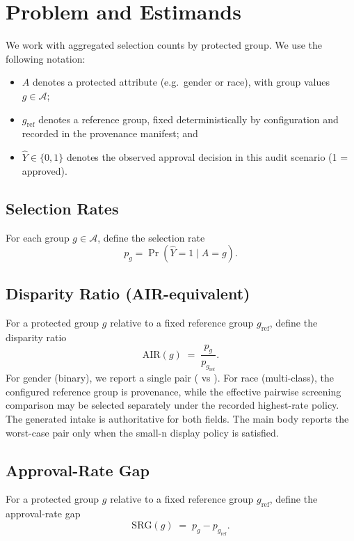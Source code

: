 
\section{Problem and Estimands}
We work with aggregated selection counts by protected group. We use the following notation:
\begin{itemize}
\item $A$ denotes a protected attribute (e.g.\ gender or race), with group values $g\in\mathcal{A}$;
\item $g_{\mathrm{ref}}$ denotes a reference group, fixed deterministically by configuration and recorded in the provenance manifest; and
\item $\hat{Y}\in\{0,1\}$ denotes the observed approval decision in this audit scenario (1 = approved).
\end{itemize}

\subsection{Selection Rates}
For each group $g\in\mathcal{A}$, define the selection rate
\begin{equation}
p_g=\Pr(\hat{Y}=1\mid A=g).
\end{equation}

\subsection{Disparity Ratio (AIR-equivalent)}
For a protected group $g$ relative to a fixed reference group $g_{\mathrm{ref}}$, define the disparity ratio
\begin{equation}
\mathrm{AIR}(g) \;=\; \frac{p_g}{p_{g_{\mathrm{ref}}}}.
\label{eq:air}
\end{equation}
For gender (binary), we report a single pair (\GenderProtectedGroup{} vs \GenderReferenceGroup{}). For race (multi-class), the configured reference group is provenance, while the effective pairwise screening comparison may be selected separately under the recorded highest-rate policy. The generated intake is authoritative for both fields. The main body reports the worst-case pair only when the small-n display policy is satisfied.

\subsection{Approval-Rate Gap}
For a protected group $g$ relative to a fixed reference group $g_{\mathrm{ref}}$, define the approval-rate gap
\begin{equation}
\mathrm{SRG}(g) \;=\; p_g - p_{g_{\mathrm{ref}}}.
\label{eq:srg}
\end{equation}

